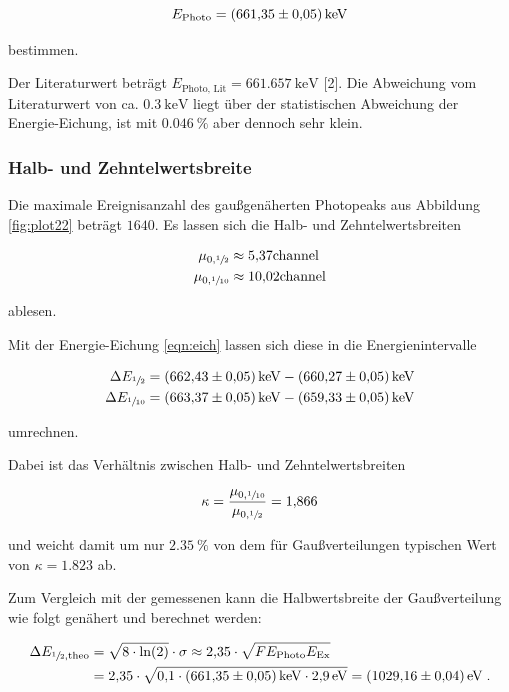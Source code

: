 \begin{equation*}
  E_\text{Photo} = \SI{661.35 +- 0.05}{\kilo\eV}
\end{equation*}

bestimmen.

Der Literaturwert beträgt $E_\text{Photo, Lit} = \SI{661.657}{\kilo\eV}$ [2]. Die Abweichung vom Literaturwert 
von ca. $\SI{0.3}{\kilo\eV}$ liegt über der statistischen Abweichung der Energie-Eichung, 
ist mit $\SI{0.046}{\percent}$ aber dennoch sehr klein.

\subsubsection{Halb- und Zehntelwertsbreite}

Die maximale Ereignisanzahl des gaußgenäherten Photopeaks aus Abbildung \ref{fig:plot22} beträgt $\num{1640}$.
Es lassen sich die Halb- und Zehntelwertsbreiten 

\begin{align*}
  \mu_{0, \sfrac{1}{2}} &\approx \num{5.37}\text{channel} \\
  \mu_{0, \sfrac{1}{10}} &\approx \num{10.02}\text{channel}
\end{align*} 

ablesen.

Mit der Energie-Eichung \eqref{eqn:eich} lassen sich diese in die Energienintervalle

\begin{align*}
  \Delta E_{\sfrac{1}{2}}  &= \SI{662.43 +- 0.05}{\kilo\eV} - \SI{660.27 +- 0.05}{\kilo\eV} \\
  \Delta E_{\sfrac{1}{10}} &= \SI{663.37 +- 0.05}{\kilo\eV} - \SI{659.33 +- 0.05}{\kilo\eV}
\end{align*}

umrechnen.

Dabei ist das Verhältnis zwischen Halb- und Zehntelwertsbreiten

\begin{equation}
  \kappa = \frac{\mu_{0, \sfrac{1}{10}}}{\mu_{0, \sfrac{1}{2}}} = \num{1.866}
\end{equation}

und weicht damit um nur $\SI{2.35}{\percent}$ von dem für Gaußverteilungen typischen Wert von $\kappa = \num{1.823}$ ab.

Zum Vergleich mit der gemessenen kann die Halbwertsbreite der Gaußverteilung wie folgt genähert und berechnet werden:

\begin{align}
  \Delta E_{\sfrac{1}{2}, \text{theo}} &= \sqrt{8 \cdot \text{ln}(2)} \cdot \sigma \approx \num{2.35} \cdot \sqrt{F E_\text{Photo} E_\text{Ex}} \\
  &= \num{2.35} \cdot \sqrt{\num{0.1}\cdot \SI{661.35 +- 0.05}{\kilo\eV} \cdot \SI{2.9}{\eV}} = \SI{1029.16 +- 0.04}{\eV} \; .
\end{align}


